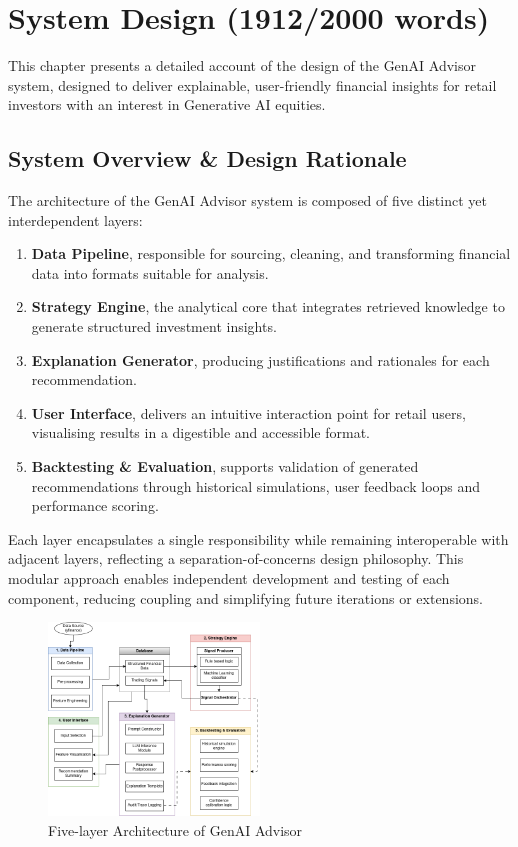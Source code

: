 \section{System Design (1912/2000 words)}

This chapter presents a detailed account of the design of the GenAI Advisor system, designed to deliver explainable, user-friendly financial insights for retail investors with an interest in Generative AI equities.

\subsection{System Overview \& Design Rationale}

The architecture of the GenAI Advisor system is composed of five distinct yet interdependent layers:

\begin{enumerate}
    \item \textbf{Data Pipeline}, responsible for sourcing, cleaning, and transforming financial data into formats suitable for analysis.
    \item \textbf{Strategy Engine}, the analytical core that integrates retrieved knowledge to generate structured investment insights.
    \item \textbf{Explanation Generator}, producing justifications and rationales for each recommendation.
    \item \textbf{User Interface}, delivers an intuitive interaction point for retail users, visualising results in a digestible and accessible format.
    \item \textbf{Backtesting \& Evaluation}, supports validation of generated recommendations through historical simulations, user feedback loops and performance scoring.
\end{enumerate}

Each layer encapsulates a single responsibility while remaining interoperable with adjacent layers, reflecting a separation-of-concerns design philosophy. This modular approach enables independent development and testing of each component, reducing coupling and simplifying future iterations or extensions.

\begin{figure}[ht]
    \centering
    \includegraphics[width=0.5\textwidth]{assets/systemDesign.png}
    \caption{Five-layer Architecture of GenAI Advisor}
    \label{fig:systemDesign}
\end{figure}

